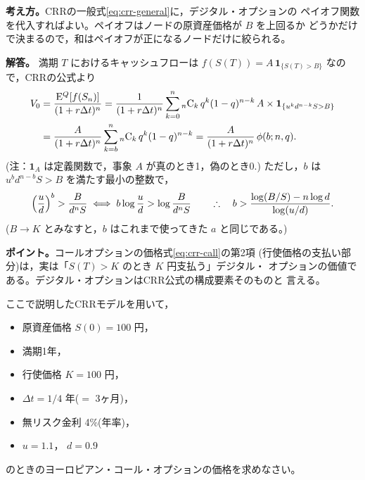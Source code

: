 \begin{answerbox}
\textbf{考え方。}CRRの一般式\eqref{eq:crr-general}に，デジタル・オプションの
ペイオフ関数を代入すればよい。ペイオフはノードの原資産価格が $B$ を上回るか
どうかだけで決まるので，和はペイオフが正になるノードだけに絞られる。

\medskip
\textbf{解答。}
満期 $T$ におけるキャッシュフローは
$f(S(T)) = A\,\bm{1}_{\{S(T)>B\}}$ なので，CRRの公式より
\begin{align*}
V_0 &= \frac{\mathrm{E}^Q[f(S_n)]}{(1+r\Delta t)^n}
= \frac{1}{(1+r\Delta t)^n}\sum_{k=0}^{n}
{}_n\mathrm{C}_k\,q^k(1-q)^{n-k}\,A\times\bm{1}_{\{u^kd^{n-k}S > B\}}\\
&= \frac{A}{(1+r\Delta t)^n}\sum_{k=b}^{n}{}_n\mathrm{C}_k\,q^k(1-q)^{n-k}
= \frac{A}{(1+r\Delta t)^n}\,\phi(b;n,q).
\end{align*}
(注：$\bm{1}_A$ は定義関数で，事象 $A$ が真のとき1，偽のとき0.)
ただし，$b$ は $u^bd^{n-b}S > B$ を満たす最小の整数で，
\[
\Bigl(\frac{u}{d}\Bigr)^b > \frac{B}{d^nS}
\;\Longleftrightarrow\;
b\log\frac{u}{d} > \log\frac{B}{d^nS}
\qquad\therefore\quad
b > \frac{\log(B/S) - n\log d}{\log(u/d)}.
\]
($B\to K$ とみなすと，$b$ はこれまで使ってきた $a$ と同じである。)

\medskip
\textbf{ポイント。}コールオプションの価格式\eqref{eq:crr-call}の第2項
(行使価格の支払い部分)は，実は「$S(T)>K$ のとき $K$ 円支払う」デジタル・
オプションの価値である。デジタル・オプションはCRR公式の構成要素そのものと
言える。
\end{answerbox}

\begin{exercise}[問題11-3]
ここで説明したCRRモデルを用いて，
\begin{itemize}
\item 原資産価格 $S(0) = 100$ 円，
\item 満期1年，
\item 行使価格 $K = 100$ 円，
\item $\Delta t = 1/4$ 年($=$ 3ヶ月)，
\item 無リスク金利 4\%(年率)，
\item $u = 1.1$， $d = 0.9$
\end{itemize}
のときのヨーロピアン・コール・オプションの価格を求めなさい。
\end{exercise}

